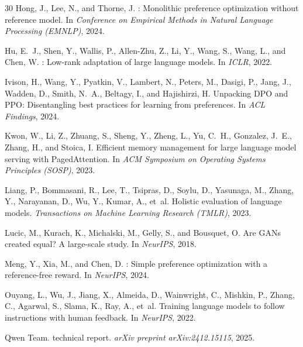 \documentclass{article}
\begin{document}
\begin{thebibliography}{30}
Hong, J., Lee, N., and Thorne, J.
: Monolithic preference optimization without reference model.
\newblock In \emph{Conference on Empirical Methods in Natural Language Processing (EMNLP)}, 2024.

Hu, E.~J., Shen, Y., Wallis, P., Allen-Zhu, Z., Li, Y., Wang, S., Wang, L., and Chen, W.
: Low-rank adaptation of large language models.
\newblock In \emph{ICLR}, 2022.

Ivison, H., Wang, Y., Pyatkin, V., Lambert, N., Peters, M., Dasigi, P., Jang, J., Wadden, D., Smith, N.~A., Beltagy, I., and Hajishirzi, H.
\newblock Unpacking {DPO} and {PPO}: Disentangling best practices for learning from preferences.
\newblock In \emph{ACL Findings}, 2024.

Kwon, W., Li, Z., Zhuang, S., Sheng, Y., Zheng, L., Yu, C.~H., Gonzalez, J.~E., Zhang, H., and Stoica, I.
\newblock Efficient memory management for large language model serving with {PagedAttention}.
\newblock In \emph{ACM Symposium on Operating Systems Principles (SOSP)}, 2023.

Liang, P., Bommasani, R., Lee, T., Tsipras, D., Soylu, D., Yasunaga, M., Zhang, Y., Narayanan, D., Wu, Y., Kumar, A., et~al.
\newblock Holistic evaluation of language models.
\newblock \emph{Transactions on Machine Learning Research (TMLR)}, 2023.

Lucic, M., Kurach, K., Michalski, M., Gelly, S., and Bousquet, O.
\newblock Are {GANs} created equal? {A} large-scale study.
\newblock In \emph{NeurIPS}, 2018.

Meng, Y., Xia, M., and Chen, D.
: Simple preference optimization with a reference-free reward.
\newblock In \emph{NeurIPS}, 2024.

Ouyang, L., Wu, J., Jiang, X., Almeida, D., Wainwright, C., Mishkin, P., Zhang, C., Agarwal, S., Slama, K., Ray, A., et~al.
\newblock Training language models to follow instructions with human feedback.
\newblock In \emph{NeurIPS}, 2022.

Qwen Team.
 technical report.
\newblock \emph{arXiv preprint arXiv:2412.15115}, 2025.


\end{thebibliography}
\end{document}
